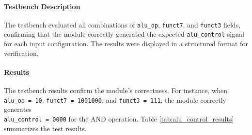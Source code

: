 \documentclass[12pt]{article}
\begin{document}
\paragraph{Testbench Description}
The testbench evaluated all combinations of \texttt{alu\_op}, \texttt{funct7}, and \texttt{funct3} fields, confirming that the module correctly generated the expected \texttt{alu\_control} signal for each input configuration. The results were displayed in a structured format for verification.

\paragraph{Results}
The testbench results confirm the module's correctness. For instance, when \texttt{alu\_op = 10}, \texttt{funct7 = 1001000}, and \texttt{funct3 = 111}, the module correctly generates \\ \texttt{alu\_control = 0000} for the AND operation. Table \ref{tab:alu_control_results} summarizes the test results.
\end{document}
